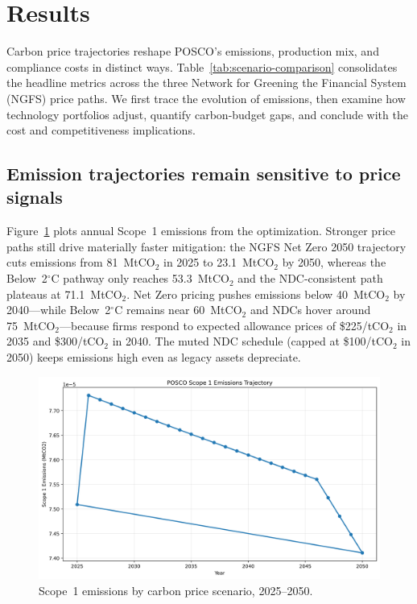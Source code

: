 \documentclass[preprint,1p,authoryear]{elsarticle}
\begin{document}




\section{Results}

Carbon price trajectories reshape POSCO's emissions, production mix, and compliance costs in distinct ways. Table~\ref{tab:scenario-comparison} consolidates the headline metrics across the three Network for Greening the Financial System (NGFS) price paths. We first trace the evolution of emissions, then examine how technology portfolios adjust, quantify carbon-budget gaps, and conclude with the cost and competitiveness implications.

\subsection{Emission trajectories remain sensitive to price signals}

Figure~\ref{fig:scope1-by-scenario} plots annual Scope~1 emissions from the optimization. Stronger price paths still drive materially faster mitigation: the NGFS Net Zero 2050 trajectory cuts emissions from 81~MtCO$_2$ in 2025 to 23.1~MtCO$_2$ by 2050, whereas the Below~2$^\circ$C pathway only reaches 53.3~MtCO$_2$ and the NDC-consistent path plateaus at 71.1~MtCO$_2$. Net Zero pricing pushes emissions below 40~MtCO$_2$ by 2040—while Below~2$^\circ$C remains near 60~MtCO$_2$ and NDCs hover around 75~MtCO$_2$—because firms respond to expected allowance prices of \$225/tCO$_2$ in 2035 and \$300/tCO$_2$ in 2040. The muted NDC schedule (capped at \$100/tCO$_2$ in 2050) keeps emissions high even as legacy assets depreciate.

\begin{figure}[!t]
  \centering
  \includegraphics[width=0.8\linewidth]{scope1_by_scenario}
  \caption{Scope~1 emissions by carbon price scenario, 2025--2050.}
  \label{fig:scope1-by-scenario}
\end{figure}
\end{document}
